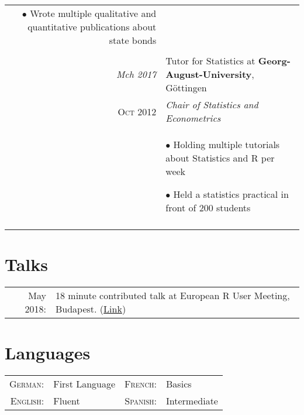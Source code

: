 \documentclass[a4paper,10pt]{article} %
\begin{document}
\begin{longtable}{r|p{10cm}}
{$\bullet$ Wrote multiple qualitative and quantitative publications about state bonds}\\
\multicolumn{2}{c}{} \\


\emph{Mch 2017} & Tutor for Statistics at \textbf{Georg-August-University}, Göttingen\\
\textsc{Oct 2012} & \emph{Chair of Statistics and Econometrics}\\
& \footnotesize{$\bullet$ Holding multiple tutorials about Statistics and R per week

$\bullet$ Held a statistics practical in front of 200 students}\\
\multicolumn{2}{c}{} \\


\end{longtable}


\section{Talks}
\begin{tabular}{rl}
May 2018: & 18 minute contributed talk at European R User Meeting, Budapest. (\href{https://www.youtube.com/watch?v=ZeBvYWCxkOE}{Link})\\
\end{tabular}


\section{Languages}

\begin{tabular}{rlrl}
\textsc{German:} & First Language & \textsc{French:} & Basics\\
\textsc{English:} & Fluent &\textsc{Spanish:}& Intermediate\\
\end{tabular}

\end{document}
